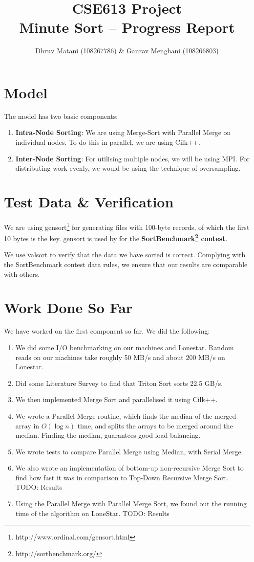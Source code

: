\documentclass{article}
\title{CSE613 Project\\Minute Sort -- Progress Report}
\author{Dhruv Matani (108267786) \& Gaurav Menghani (108266803)}
\begin{document}
\maketitle

\clearpage

\section{Model}
The model has two basic components:
\begin{enumerate}
\item {\bf{Intra-Node Sorting}}: We are using Merge-Sort with Parallel Merge on individual nodes. To do this in parallel, 
we are using Cilk++. 

\item {\bf{Inter-Node Sorting}}: For utilising multiple nodes, we will be using MPI. For distributing work evenly, 
we would be using the technique of oversampling.
\end{enumerate}

\section{Test Data \& Verification}
We are using gensort\footnote{http://www.ordinal.com/gensort.html} for generating files with 100-byte records, 
of which the first 10 bytes is the key. gensort is used by for the {\bf SortBenchmark\footnote{http://sortbenchmark.org/} contest}.

We use valsort to verify that the data we have sorted is correct. Complying with the SortBenchmark contest data
rules, we ensure that our results are comparable with others.

\section{Work Done So Far}
We have worked on the first component so far. We did the following:
\begin{enumerate}
\item We did some I/O benchmarking on our machines and Lonestar. Random reads on our machines take roughly 50 MB/s and about 200 MB/s on Lonestar. 
\item Did some Literature Survey to find that Triton Sort sorts 22.5 GB/s.
\item We then implemented Merge Sort and parallelised it using Cilk++.
\item We wrote a Parallel Merge routine, which finds the median of the merged array in $O(\log{n})$ time, and splits the arrays to be merged around the median. Finding the median, guarantees good load-balancing.
\item We wrote tests to compare Parallel Merge using Median, with Serial Merge.
\item We also wrote an implementation of bottom-up non-recursive Merge Sort to find how fast it was in comparison to Top-Down Recursive Merge Sort. TODO: Results
\item Using the Parallel Merge with Parallel Merge Sort, we found out the running time of the algorithm on LoneStar. TODO: Results
\end{enumerate}
\end{document}
